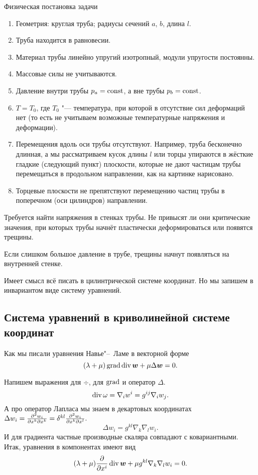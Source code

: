 Физическая постановка задачи
\begin{enumerate}
\item Геометрия: круглая труба; радиусы сечений $a$, $b$, длина $l$.
\item Труба находится в равновесии.
\item Материал трубы линейно упругий изотропный, модули упругости постоянны.
\item Массовые силы не учитываются.
\item Давление внутри трубы $p_a=\operatorname{const}$, а вне трубы $p_b=\operatorname{const}$.
\item $T=T_0$, где $T_0$ "--- температура, при которой в отсутствие сил деформаций нет (то есть не учитываем возможные температурные напряжения и деформации).
\item Перемещения вдоль оси трубы отсутствуют. Например, труба бесконечно длинная, а мы рассматриваем кусок длины $l$ или торцы упираются в жёсткие гладкие (следующий пункт) плоскости, которые не дают частицам трубы перемещаться в продольном направлении, как на картинке нарисовано.
\item Торцевые плоскости не препятствуют перемещению частиц трубы в поперечном (оси цилиндров) направлении.
\end{enumerate}
Требуется найти напряжения в стенках трубы. Не привысят ли они критические значения, при которых трубы начнёт пластически деформироваться или появятся трещины.

Если слишком большое давление в трубе, трещины начнут появляться на внутренней стенке.

Имеет смысл всё писать в цилинтрической системе координат. Но мы запишем в инвариантом виде систему уравнений.
\subsection{Система уравнений в криволинейной системе координат}

Как мы писали уравнения Навье"--~Ламе в векторной форме
\[
  (\lambda+\mu)\operatorname{grad}\operatorname{div}\boldsymbol{w} + \mu\Delta\boldsymbol{w} = 0.
\]

Напишем выражения для $\div$, для $\operatorname{grad}$ и оператор $\Delta$.
\[
  \operatorname{div}\omega = \nabla_i w^i = g^{ij}\nabla_iw_j.
\]
А про оператор Лапласа мы знаем в декартовых координатах
$
  \Delta w_i = \frac{\partial ^2w_i}{\partial x^k\partial x^k} = \delta^{kl}\frac{\partial ^2w_i}{\partial x^k\partial x^l}.
$
\[
  \Delta w_i = g^{kl}\nabla_k\nabla_l w_i.
\]
И для градиента частные производные скаляра совпадают с ковариантными. Итак, уравнения в компонентах имеют вид
\[
  (\lambda+\mu)\frac{\partial  }{\partial x^i} \operatorname{div}\boldsymbol{w} + \mu g^{kl}\nabla_k\nabla_l w_i = 0.
\]

